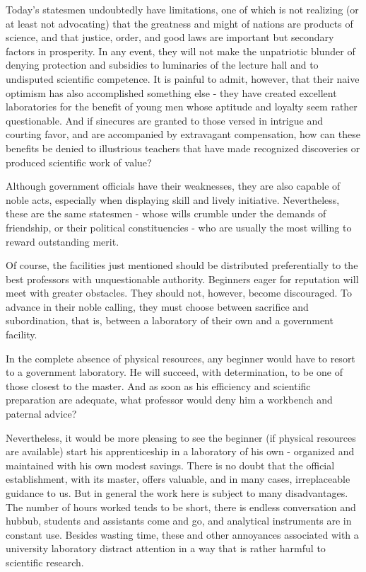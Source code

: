\documentclass{article}
\begin{document}
Today’s statesmen undoubtedly have limitations, one of which is not realizing (or at least not advocating) that the greatness and might of nations are products of science, and that justice, order, and good laws are important but secondary factors in prosperity. In any event, they will not make the unpatriotic blunder of denying protection and subsidies to luminaries of the lecture hall and to undisputed scientific competence. It is painful to admit, however, that their naive optimism has also accomplished something else - they have created excellent laboratories for the benefit of young men whose aptitude and loyalty seem rather questionable. And if sinecures are granted to those versed in intrigue and courting favor, and are accompanied by extravagant compensation, how can these benefits be denied to illustrious teachers that have made recognized discoveries or produced scientific work of value?

Although government officials have their weaknesses, they are also capable of noble acts, especially when displaying skill and lively initiative. Nevertheless, these are the same statesmen - whose wills crumble under the demands of friendship, or their political constituencies - who are usually the most willing to reward outstanding merit.

Of course, the facilities just mentioned should be distributed preferentially to the best professors with unquestionable authority. Beginners eager for reputation will meet with greater obstacles. They should not, however, become discouraged. To advance in their noble calling, they must choose between sacrifice and subordination, that is, between a laboratory of their own and a government facility.

In the complete absence of physical resources, any beginner would have to resort to a government laboratory. He will succeed, with determination, to be one of those closest to the master. And as soon as his efficiency and scientific preparation are adequate, what professor would deny him a workbench and paternal advice?

Nevertheless, it would be more pleasing to see the beginner (if physical resources are available) start his apprenticeship in a laboratory of his own - organized and maintained with his own modest savings. There is no doubt that the official establishment, with its master, offers valuable, and in many cases, irreplaceable guidance to us. But in general the work here is subject to many disadvantages. The number of hours worked tends to be short, there is endless conversation and hubbub, students and assistants come and go, and analytical instruments are in constant use. Besides wasting time, these and other annoyances associated with a university laboratory distract attention in a way that is rather harmful to scientific research.
\end{document}
